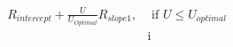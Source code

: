 \documentclass[preview]{standalone}
\begin{document}
\begin{align*}
R_{intercept} +  \frac{U}{U_{Optimal}} R_{slope1}, & \text{     if }  U \leq U_{optimal}  \\[6pt] & \text{i}
\end{align*}
\end{document}
